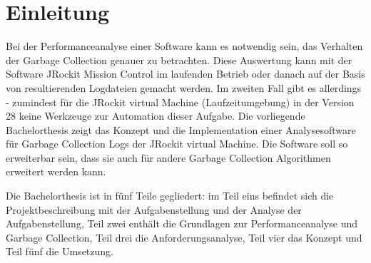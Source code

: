 \chapter*{Einleitung}
Bei der Performanceanalyse einer Software kann es notwendig sein, das  Verhalten der Garbage Collection genauer zu betrachten. Diese Auswertung kann mit der Software JRockit Mission Control im laufenden Betrieb oder danach auf der Basis von resultierenden Logdateien gemacht werden. Im zweiten Fall gibt es allerdings - zumindest für die JRockit virtual Machine (Laufzeitumgebung) in der Version 28 keine Werkzeuge zur Automation dieser Aufgabe. Die vorliegende Bachelorthesis zeigt das Konzept und die Implementation einer Analysesoftware für Garbage Collection Logs der JRockit virtual Machine. Die Software soll so erweiterbar sein, dass sie auch für andere Garbage Collection Algorithmen erweitert werden kann.

Die Bachelorthesis ist in fünf Teile gegliedert: im Teil eins befindet sich die Projektbeschreibung mit der Aufgabenstellung und der Analyse der Aufgabenstellung, Teil zwei enthält die Grundlagen zur Performanceanalyse und Garbage Collection, Teil drei die Anforderungsanalyse, Teil vier das Konzept und Teil fünf die Umsetzung.